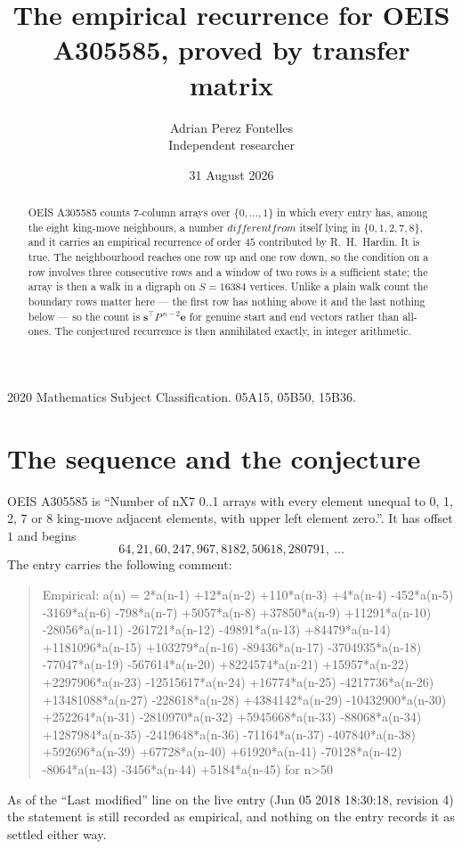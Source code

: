\documentclass[11pt,a4paper]{article}
\title{The empirical recurrence for OEIS A305585, proved by transfer matrix}
\author{Adrian Perez Fontelles\\ \small Independent researcher}
\date{31 August 2026}
\theoremstyle{plain}
\theoremstyle{definition}
\begin{document}
\maketitle

\begin{abstract}
OEIS A305585 counts $7$-column arrays over $\{0,\dots,1\}$ in which every entry has,
among the eight king-move neighbours, a number $different from$ itself lying in $\{0,1,2,7,8\}$, and it carries an empirical
recurrence of order $45$ contributed by R.~H.~Hardin. It is true. The neighbourhood
reaches one row up and one row down, so the condition on a row involves three consecutive
rows and a window of two rows is a sufficient state; the array is then a walk in a digraph
on $S=16384$ vertices. Unlike a plain walk count the boundary rows matter here --- the first
row has nothing above it and the last nothing below --- so the count is
$\mathbf{s}^{\!\top}P^{\,n-2}\mathbf{e}$ for genuine start and end vectors rather than
all-ones. The conjectured recurrence is then annihilated exactly, in integer arithmetic.
\end{abstract}

\noindent\small 2020 Mathematics Subject Classification. 05A15, 05B50, 15B36.\normalsize

\section{The sequence and the conjecture}

OEIS A305585 is ``Number of nX7 0..1 arrays with every element unequal to 0, 1, 2, 7 or 8 king-move adjacent elements, with upper left element zero.''. It has offset
$1$ and begins
\[
64, 21, 60, 247, 967, 8182, 50618, 280791,\ \dots
\]
The entry carries the following comment:
\begin{quote}\small
Empirical: a(n) = 2*a(n-1) +12*a(n-2) +110*a(n-3) +4*a(n-4) -452*a(n-5) -3169*a(n-6) -798*a(n-7) +5057*a(n-8) +37850*a(n-9) +11291*a(n-10) -28056*a(n-11) -261721*a(n-12) -49891*a(n-13) +84479*a(n-14) +1181096*a(n-15) +103279*a(n-16) -89436*a(n-17) -3704935*a(n-18) -77047*a(n-19) -567614*a(n-20) +8224574*a(n-21) +15957*a(n-22) +2297906*a(n-23) -12515617*a(n-24) +16774*a(n-25) -4217736*a(n-26) +13481088*a(n-27) -228618*a(n-28) +4384142*a(n-29) -10432900*a(n-30) +252264*a(n-31) -2810970*a(n-32) +5945668*a(n-33) -88068*a(n-34) +1287984*a(n-35) -2419648*a(n-36) -71164*a(n-37) -407840*a(n-38) +592696*a(n-39) +67728*a(n-40) +61920*a(n-41) -70128*a(n-42) -8064*a(n-43) -3456*a(n-44) +5184*a(n-45) for n>50
\end{quote}
As of the ``Last modified'' line on the live entry (Jun 05 2018 18:30:18, revision
4) the statement is still recorded as empirical, and nothing on the entry
records it as settled either way.
\end{document}
